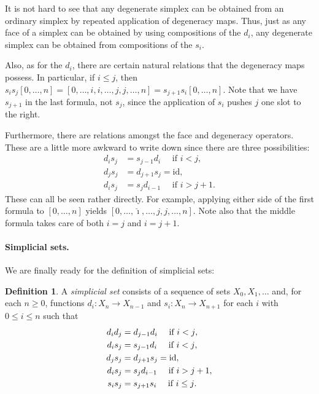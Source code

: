 \documentclass[12pt]{article}
\theoremstyle{plain}
\theoremstyle{definition}
\newtheorem{definition}[theorem]{Definition}
\theoremstyle{remark}
\begin{document}
It is not hard to see that any degenerate simplex can be obtained from an ordinary simplex by repeated application of degeneracy maps. Thus, just as any face of a simplex can be obtained by using compositions of the $d_i$,  any degenerate simplex can be obtained from compositions of the $s_i$. 

Also, as for the $d_i$, there are certain natural relations that the degeneracy maps possess. In particular, if $i\leq j$, then $s_is_j[0,\ldots,n]=[0,\ldots, i,i,\ldots, j,j,\ldots,n]=s_{j+1}s_i [0,\ldots,n]$. Note that we have $s_{j+1}$ in the last formula, not $s_j$, since the application of $s_i$ pushes $j$ one slot to the right. 

Furthermore, there are relations amongst the face and degeneracy operators. These are a little more awkward to write down since there are three possibilities: 
\begin{align*}
 d_i s_j &= s_{j-1} d_i\quad\text{ if $i < j$},\\
d_j s_j &= d_{j+1} s_j=\text{id},\\
 d_i s_j &= s_j d_{i-1}\quad  \text{ if $i > j + 1$}.
\end{align*}
These can all be seen rather directly. For example, applying either side of the first formula to $[0,\ldots,n]$ yields $[0,\ldots,\hat \imath,\ldots ,j,j,\ldots, n]$. Note also that the middle formula takes care of both $i=j$ and $i=j+1$. 

















\paragraph{Simplicial sets.}

We are finally ready for the definition of simplicial sets:
\begin{definition}\label{D: ss}
A \emph{simplicial set} consists of a sequence of sets $X_0, X_1, \ldots$ and, for each $n\geq 0$, functions $d_i\colon X_{n}\to X_{n-1}$ and $s_i\colon X_n\to X_{n+1}$ for each $i$ with $0\leq i\leq n$  such that 
\begin{align}
 d_id_j&=d_{j-1}d_i\quad \text{ if $i<j$}, \notag\\
 d_i s_j &= s_{j-1} d_i\quad\text{ if $i < j$},\notag \\
d_j s_j &= d_{j+1} s_j=\text{id},\label{E: axioms}\\
 d_i s_j &= s_j d_{i-1}\quad  \text{ if $i > j + 1$},\notag\\
  s_is_j&=s_{j+1}s_i\quad \text{ if $i\leq j$}.\notag
\end{align}
\end{definition}
\end{document}
